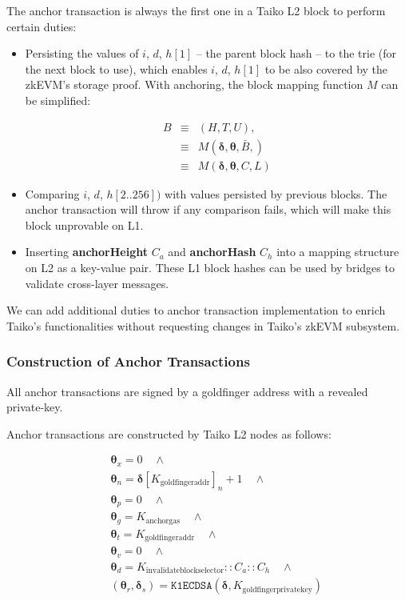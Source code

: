 \documentclass[9pt,oneside]{amsart}
\begin{document}
\begin{multicols}{2}
The anchor transaction is always the first one in a Taiko L2 block to perform certain duties:

\begin{itemize}
\item Persisting the values of $i$, $d$, $h[1]$ -- the parent block hash -- to the trie (for the next block to use), which enables $i$, $d$, $h[1]$ to be also covered by the zkEVM's storage proof.   With anchoring, the block mapping function $M$  can be simplified:

\begin{eqnarray}
B & \equiv & (H, T, U), \\
\nonumber & \equiv &  M(\boldsymbol{\delta}, \boldsymbol{\theta}, \bar{B}, )  \\
\nonumber & \equiv & M(\boldsymbol{\delta},  \boldsymbol{\theta}, C, L)
\end{eqnarray}

\item Comparing $i$, $d$, $h[2..256])$ with values persisted by previous blocks. The anchor transaction will throw if any comparison fails, which will make this block unprovable on L1.
\item Inserting \textbf{anchorHeight} $C_a$ and \textbf{anchorHash} $C_h$ into a mapping structure on L2 as a key-value pair. These L1 block hashes can be used by bridges to validate cross-layer messages.
\end{itemize}

We can add additional duties to anchor transaction implementation to enrich Taiko's functionalities without requesting changes in Taiko's zkEVM subsystem.

\subsubsection{Construction of Anchor Transactions} All anchor transactions are signed by a goldfinger address with a revealed private-key. 

Anchor transactions are constructed by Taiko L2 nodes as follows:

\begin{eqnarray}
& & \boldsymbol{\theta}_x = 0 \quad \wedge \\
\nonumber& & \boldsymbol{\theta}_n = \boldsymbol{\delta}[K_{\mathrm{goldfingeraddr}}]_n + 1 \quad \wedge \\
\nonumber& & \boldsymbol{\theta}_p = 0 \quad \wedge \\
\nonumber& & \boldsymbol{\theta}_g = K_{\mathrm{anchorgas}} \quad \wedge \\
\nonumber& & \boldsymbol{\theta}_t = K_{\mathrm{goldfingeraddr}} \quad \wedge  \\
\nonumber& & \boldsymbol{\theta}_v = 0 \quad \wedge  \\
\nonumber& & \boldsymbol{\theta}_d = K_{\mathrm{invalidateblockselector}}::C_a::C_h \quad \wedge  \\
\nonumber& & (\boldsymbol{\theta}_r,\boldsymbol{\delta}_s) = \texttt{K1ECDSA}(\boldsymbol{\delta}, K_{\mathrm{goldfingerprivatekey}})
\end{eqnarray}


\end{multicols}
\end{document}
